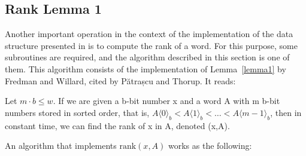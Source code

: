 \newpage
\subsection{Rank Lemma 1} \label{sec:rankLemma1}

Another important operation in the context of the implementation of the data structure presented in \cite{patrascu2014dynamic} is to compute the rank of a word. For this purpose, some subroutines are required, and the algorithm described in this section is one of them. This algorithm consists of the implementation of Lemma~\ref{lemma1} by Fredman and Willard, cited by Pătrașcu and Thorup. It reads:
\begin{lemma} \label{lemma1}
Let $m \cdot b \leq w$. If we are given a b-bit number x and a word A with m b-bit numbers stored in sorted order, that is, $A\langle 0 \rangle_b < A\langle 1 \rangle_b < \dots < A\langle m - 1 \rangle_b$, then in constant time, we can find the rank of x in A, denoted (x,A).
\end{lemma}
An algorithm that implements $\text{rank}(x,A)$ works as the following:

